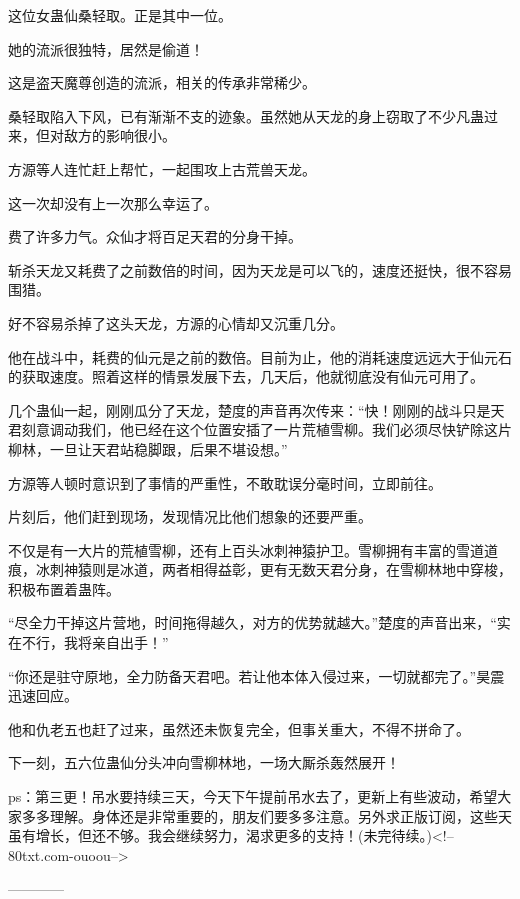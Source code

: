 \begin{this_body}
这位女蛊仙桑轻取。正是其中一位。

她的流派很独特，居然是偷道！

这是盗天魔尊创造的流派，相关的传承非常稀少。

桑轻取陷入下风，已有渐渐不支的迹象。虽然她从天龙的身上窃取了不少凡蛊过来，但对敌方的影响很小。

方源等人连忙赶上帮忙，一起围攻上古荒兽天龙。

这一次却没有上一次那么幸运了。

费了许多力气。众仙才将百足天君的分身干掉。

斩杀天龙又耗费了之前数倍的时间，因为天龙是可以飞的，速度还挺快，很不容易围猎。

好不容易杀掉了这头天龙，方源的心情却又沉重几分。

他在战斗中，耗费的仙元是之前的数倍。目前为止，他的消耗速度远远大于仙元石的获取速度。照着这样的情景发展下去，几天后，他就彻底没有仙元可用了。

几个蛊仙一起，刚刚瓜分了天龙，楚度的声音再次传来：“快！刚刚的战斗只是天君刻意调动我们，他已经在这个位置安插了一片荒植雪柳。我们必须尽快铲除这片柳林，一旦让天君站稳脚跟，后果不堪设想。”

方源等人顿时意识到了事情的严重性，不敢耽误分毫时间，立即前往。

片刻后，他们赶到现场，发现情况比他们想象的还要严重。

不仅是有一大片的荒植雪柳，还有上百头冰刺神猿护卫。雪柳拥有丰富的雪道道痕，冰刺神猿则是冰道，两者相得益彰，更有无数天君分身，在雪柳林地中穿梭，积极布置着蛊阵。

“尽全力干掉这片营地，时间拖得越久，对方的优势就越大。”楚度的声音出来，“实在不行，我将亲自出手！”

“你还是驻守原地，全力防备天君吧。若让他本体入侵过来，一切就都完了。”昊震迅速回应。

他和仇老五也赶了过来，虽然还未恢复完全，但事关重大，不得不拼命了。

下一刻，五六位蛊仙分头冲向雪柳林地，一场大厮杀轰然展开！

ps：第三更！吊水要持续三天，今天下午提前吊水去了，更新上有些波动，希望大家多多理解。身体还是非常重要的，朋友们要多多注意。另外求正版订阅，这些天虽有增长，但还不够。我会继续努力，渴求更多的支持！(未完待续。)<!--80txt.com-ouoou-->

------------

\end{this_body}

